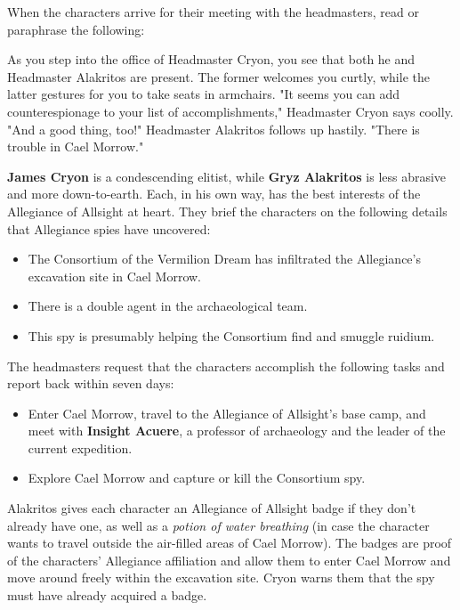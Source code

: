 \documentclass[a4paper, 11pt, bg=full, twocolumn, nooutline]{dndbook}
\begin{document}
When the characters arrive for their meeting with the headmasters, read or paraphrase the following:

\begin{DndReadAloud}
As you step into the office of Headmaster Cryon, you see that both he and Headmaster Alakritos are present. The former welcomes you curtly, while the latter gestures for you to take seats in armchairs.
"It seems you can add counterespionage to your list of accomplishments," Headmaster Cryon says coolly.
"And a good thing, too!" Headmaster Alakritos follows up hastily. "There is trouble in Cael Morrow."
\end{DndReadAloud}

\textbf{James Cryon} is a condescending elitist, while \textbf{Gryz Alakritos} is less abrasive and more down-to-earth. Each, in his own way, has the best interests of the Allegiance of Allsight at heart. They brief the characters on the following details that Allegiance spies have uncovered:

\begin{itemize}
\item The Consortium of the Vermilion Dream has infiltrated the Allegiance's excavation site in Cael Morrow.
\item There is a double agent in the archaeological team.
\item This spy is presumably helping the Consortium find and smuggle ruidium.
\end{itemize}

The headmasters request that the characters accomplish the following tasks and report back within seven days:

\begin{itemize}
\item Enter Cael Morrow, travel to the Allegiance of Allsight's base camp, and meet with \textbf{Insight Acuere}, a professor of archaeology and the leader of the current expedition.
\item Explore Cael Morrow and capture or kill the Consortium spy.
\end{itemize}

Alakritos gives each character an Allegiance of Allsight badge if they don't already have one, as well as a \textit{potion of water breathing} (in case the character wants to travel outside the air-filled areas of Cael Morrow). The badges are proof of the characters' Allegiance affiliation and allow them to enter Cael Morrow and move around freely within the excavation site. Cryon warns them that the spy must have already acquired a badge.
\end{document}
